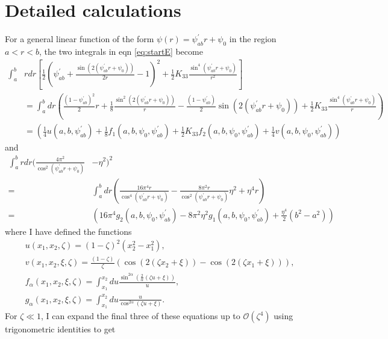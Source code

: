 \documentclass[12pt]{article}
\begin{document}
\section{Detailed calculations}
For a general linear function of the form $\psi(r)=\psi_{ab}^{\prime}r+\psi_0$ in the region $a<r<b$, the two integrals in eqn \ref{eq:startE} become
\begin{align}
\int_{a}^{b}&rdr\left[\frac{1}{2}\left(\psi_{ab}^{\prime}+\frac{\sin(2(\psi_{ab}^{\prime}r+\psi_0))}{2r}-1\right)^2+\frac{1}{2}K_{33}\frac{\sin^4(\psi_{ab}^{\prime}r+\psi_0)}{r^2}\right]\nonumber\\
&=\int_{a}^{b}dr\left(\frac{(1-\psi_{ab}^{\prime})^2}{2}r+\frac{1}{8}\frac{\sin^2(2(\psi_{ab}^{\prime}r+\psi_0))}{r}-\frac{(1-\psi_{ab}^{\prime})}{2}\sin(2(\psi_{ab}^{\prime}r+\psi_0))+\frac{1}{2}K_{33}\frac{\sin^4(\psi_{ab}^{\prime}r+\psi_0)}{r}\right)\nonumber\\
&=\left(\frac{1}{4}u(a,b,\psi_{ab}^{\prime})+\frac{1}{8}f_1(a,b,\psi_0,\psi_{ab}^{\prime})+\frac{1}{2}K_{33}f_2(a,b,\psi_0,\psi_{ab}^{\prime})+\frac{1}{4}v(a,b,\psi_0,\psi_{ab}^{\prime})\right)
\end{align}
and
\begin{align}
\int_{a}^{b}rdr\bigg(\frac{4\pi^2}{\cos^2(\psi_{ab}^{\prime}r+\psi_0)}&-\eta^2\bigg)^2\nonumber\\
=&\int_{a}^{b}dr\left(\frac{16\pi^4r}{\cos^4(\psi_{ab}^{\prime}r+\psi_0)}-\frac{8\pi^2r}{\cos^2(\psi_{ab}^{\prime}r+\psi_0)}\eta^2+\eta^4r\right)\nonumber\\
=&\left(16\pi^4g_2(a,b,\psi_0,\psi_{ab}^{\prime})-8\pi^2\eta^2g_1(a,b,\psi_0,\psi_{ab}^{\prime})+\frac{\eta^4}{2}(b^2-a^2)\right)
\end{align}
where I have defined the functions
\begin{subequations}
\begin{align}
&u(x_1,x_2,\zeta)=(1-\zeta)^2(x_2^2-x_1^2),\label{eq:ufunc}\\
&v(x_1,x_2,\xi,\zeta)=\frac{(1-\zeta)}{\zeta}(\cos(2(\zeta x_2+\xi))-\cos(2(\zeta x_1+\xi))),\label{eq:vfunc}\\
&f_{\alpha}(x_1,x_2,\xi,\zeta)=\int_{x_1}^{x_2}du\frac{\sin^{2\alpha}\left(\frac{2}{\alpha}(\zeta u+\xi)\right)}{u},\label{eq:falpha}\\
&g_{\alpha}(x_1,x_2,\xi,\zeta)=\int_{x_1}^{x_2}du\frac{u}{\cos^{2\alpha}(\zeta u+\xi)}.\label{eq:galpha}
\end{align}
\end{subequations}
For $\zeta\ll1$, I can expand the final three of these equations up to $\mathcal{O}(\zeta^4)$ using trigonometric identities to get
\end{document}
